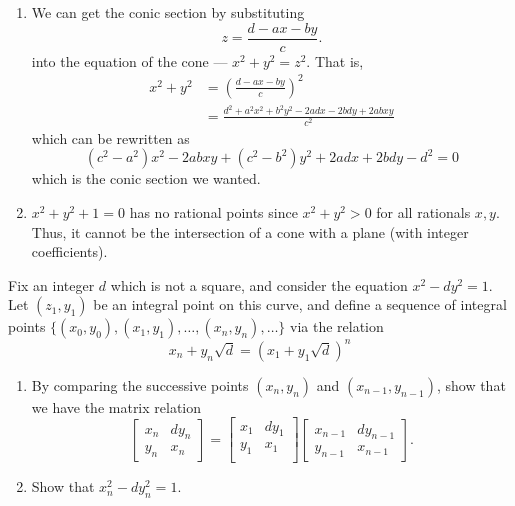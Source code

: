 \documentclass[12 pt, letterpaper]{hmcpset}
\begin{document}
\begin{solution}
\begin{enumerate}
			Since every rational $m/n$ gives a unique rational point $(x, y, z)$, and there are infinitely many rationals, there are infinitely many rational points $(x, y, z)$ on the intersection.
		\item We can get the conic section by substituting
			\[
				z = \frac{d - ax - by}{c}.
			\]
			into the equation of the cone --- $x^{2} + y^{2} = z^{2}$.
			That is,
			\[
				\begin{split}
					x^{2} + y^{2} & = \left ( \frac{d - ax - by}{c} \right )^{2} \\
						      & = \frac{d^{2} + a^{2} x^{2} + b^{2} y^{2} - 2ad x - 2 bd y + 2 a b xy}{c^{2}}
				\end{split}
			\]
			which can be rewritten as
			\[
				(c^{2} - a^{2}) x^{2} - 2ab xy + (c^{2} - b^{2}) y^{2} + 2ad x + 2bd y - d^{2} = 0
			\]
			which is the conic section we wanted.
		\item $x^{2} + y^{2} + 1 = 0$ has no rational points since $x^{2} + y^{2} > 0$ for all rationals $x, y$. Thus, it cannot be the intersection of a cone with a plane (with integer coefficients).
	\end{enumerate}
\end{solution}

\pagebreak

\begin{problem}[3]
	 Fix an integer $d$ which is not a square, and consider the equation $x^{2} - d y^{2} = 1$. Let $(z_{1}, y_{1})$ be an integral point on this curve, and define a sequence of integral points $\{ (x_{0}, y_{0}), (x_{1}, y_{1}), \dots, (x_{n}, y_{n}), \dots \}$ via the relation
	 \[
	 	x_{n} + y_{n} \sqrt{d} = (x_{1} + y_{1} \sqrt{d})^{n}
	 \]
	 \begin{enumerate}
		 \item By comparing the successive points $(x_{n}, y_{n})$ and $(x_{n - 1}, y_{n - 1})$, show that we have the matrix relation
			 \[
			 	\begin{bmatrix}
					x_{n} & d y_{n} \\
					y_{n} & x_{n}
			 	\end{bmatrix} = 
				\begin{bmatrix}
					x_{1} & d y_{1} \\
					y_{1} & x_{1} \\
				\end{bmatrix}
				\begin{bmatrix}
					x_{n - 1} & d y_{n - 1} \\
					y_{n - 1} & x_{n - 1}
				\end{bmatrix}.
			 \]
		\item Show that $x_{n}^{2} - d y_{n}^{2} = 1$.
	 \end{enumerate}
\end{problem}
\end{document}
